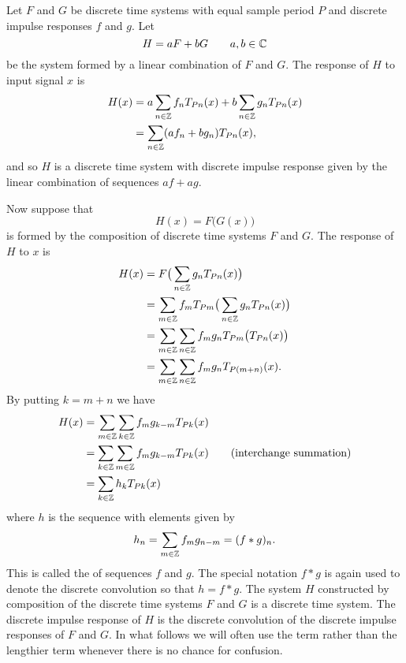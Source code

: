 Let $F$ and $G$ be discrete time systems with equal sample period $P$ and discrete impulse responses $f$ and $g$.  Let 
\[
H = a F + b G \qquad a,b\in{\mathbb C}
\]
be the system formed by a linear combination of $F$ and $G$.  The response of $H$ to input signal $x$ is
\begin{align*}
H(x) &= a \sum_{n \in {\mathbb Z}} f_{n} T_{ P n}(x) + b \sum_{n \in {\mathbb Z}} g_{n} T_{ P n}(x) \\
&=  \sum_{n \in {\mathbb Z}} (a f_{n} + b g_{n}) T_{ P n}(x),
\end{align*}
and so $H$ is a discrete time system with discrete impulse response given by the linear combination of sequences $af + ag$.

Now suppose that
\[
H(x) = F\big( G(x) \big) 
\]
is formed by the composition of discrete time systems $F$ and $G$.  The response of $H$ to $x$ is %
\begin{align*}
H(x) &= F \big( \sum_{n \in {\mathbb Z}} g_n T_{ P n}(x)  \big) \\
&= \sum_{m \in {\mathbb Z}} f_m T_{Pm} \big( \sum_{n \in {\mathbb Z}} g_n T_{ P n}(x)  \big) \\
&= \sum_{m \in {\mathbb Z}} \sum_{n \in {\mathbb Z}} f_m g_n T_{Pm}\big( T_{Pn}(x)  \big) \\
&= \sum_{m \in {\mathbb Z}} \sum_{n \in {\mathbb Z}} f_m g_n T_{P(m+n)}(x).
\end{align*}
By putting $k = m+n$ we have
\begin{align}
H(x) &= \sum_{m \in {\mathbb Z}} \sum_{k \in {\mathbb Z}} f_m g_{k-m} T_{Pk}(x) \nonumber \\
&=  \sum_{k \in {\mathbb Z}} \sum_{m \in {\mathbb Z}} f_m g_{k-m} T_{Pk}(x) \qquad \text{(interchange summation)} \label{eq:discconvinterchangesummation}\\
&= \sum_{k \in {\mathbb Z}} h_k T_{Pk}(x) \nonumber
\end{align}
where $h$ is the sequence with elements given by
\[
h_n = \sum_{m \in {\mathbb Z}} f_m g_{n-m} = (f * g)_n .
\]
This is called the  of sequences $f$ and $g$.  The special notation $f * g$ is again used to denote the discrete convolution so that $h = f * g$.  The system $H$ constructed by composition of the discrete time systems $F$ and $G$ is a discrete time system.  The discrete impulse response of $H$ is the discrete convolution of the discrete impulse responses of $F$ and $G$.  In what follows we will often use the term  rather than the lengthier term  whenever there is no chance for confusion.

